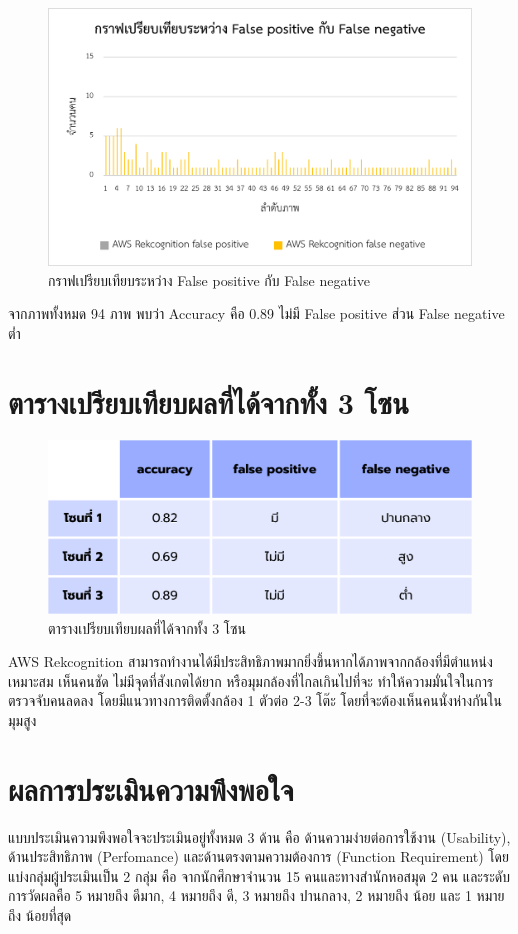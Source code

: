 \begin{figure}[ht]
    \centering
    \includegraphics[scale=1]{images/graph2_zone3-2.png}
    \caption[graph2-3]{กราฟเปรียบเทียบระหว่าง False positive กับ False negative}
    \label{fig:graph2-3}
\end{figure}
จากภาพทั้งหมด 94 ภาพ พบว่า Accuracy คือ 0.89 ไม่มี False positive ส่วน False negative ต่ำ

\section{ตารางเปรียบเทียบผลที่ได้จากทั้ง 3 โซน}
\begin{figure}[ht]
    \centering
    \includegraphics[scale=0.5]{images/comparison.png}
    \caption[comparison]{ตารางเปรียบเทียบผลที่ได้จากทั้ง 3 โซน}
    \label{fig:comparison}
\end{figure}
AWS Rekcognition สามารถทํางานได้มีประสิทธิภาพมากยิ่งขึ้นหากได้ภาพจากกล้องที่มีตําแหน่งเหมาะสม เห็นคนชัด ไม่มีจุดที่สังเกตได้ยาก หรือมุมกล้องที่ไกลเกินไปที่จะ
ทําให้ความมั่นใจในการตรวจจับคนลดลง โดยมีแนวทางการติดตั้งกล้อง 1 ตัวต่อ 2-3 โต๊ะ
โดยที่จะต้องเห็นคนนั่งห่างกันในมุมสูง

\section{ผลการประเมินความพึงพอใจ}
แบบประเมินความพึงพอใจจะประเมินอยู่ทั้งหมด 3 ด้าน คือ ด้านความง่ายต่อการใช้งาน (Usability), ด้านประสิทธิภาพ (Perfomance) และด้านตรงตามความต้องการ (Function Requirement) โดยแบ่งกลุ่มผู้ประเมินเป็น 2 กลุ่ม คือ จากนักศึกษาจำนวน 15 คนและทางสำนักหอสมุด 2 คน 
และระดับการวัดผลคือ 5 หมายถึง ดีมาก, 4 หมายถึง ดี, 3 หมายถึง ปานกลาง, 2 หมายถึง น้อย และ 1 หมายถึง น้อยที่สุด
